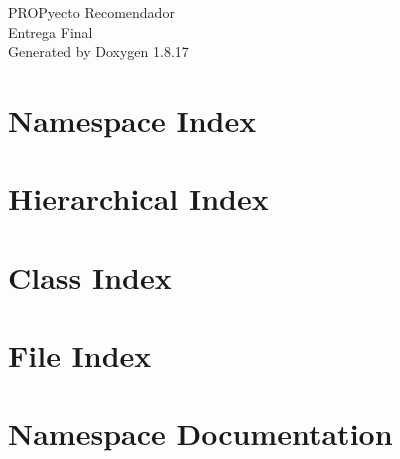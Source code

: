 \let\mypdfximage\pdfximage\def\pdfximage{\immediate\mypdfximage}\documentclass[twoside]{book}
\newcommand{\+}{\discretionary{\mbox{\scriptsize$\hookleftarrow$}}{}{}}
\newcommand{\clearemptydoublepage}{%
  \newpage{\pagestyle{empty}\cleardoublepage}%
}
\begin{document}
\hypersetup{pageanchor=false,
             bookmarksnumbered=true,
             pdfencoding=unicode
            }
\begin{titlepage}
\vspace*{7cm}
\begin{center}%
{\Large P\+R\+O\+Pyecto Recomendador \\[1ex]\large Entrega Final }\\
\vspace*{1cm}
{\large Generated by Doxygen 1.8.17}\\
\end{center}
\end{titlepage}
\clearemptydoublepage
{}
\tableofcontents
\clearemptydoublepage
{}
\hypersetup{pageanchor=true}

\chapter{Namespace Index}

\chapter{Hierarchical Index}

\chapter{Class Index}

\chapter{File Index}

\chapter{Namespace Documentation}







\end{document}
